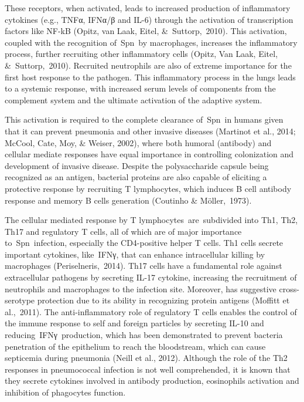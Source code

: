 \documentclass[
]{book}
\begin{document}
These receptors, when activated, leads to increased production of inflammatory cytokines (e.g., TNFα, IFNα/β and IL-6) through the activation of transcription factors like NF-kB (Opitz, van Laak, Eitel, \&~Suttorp,~2010)⁠⁠. This activation, coupled with the recognition of~Spn~by macrophages, increases the inflammatory process, further recruiting other inflammatory cells (Opitz, Van Laak, Eitel, \&~Suttorp,~2010)⁠. Recruited neutrophils are also of extreme importance for the first host response to the pathogen. This inflammatory process in the lungs leads to a systemic response, with increased serum levels of components from the complement system and the ultimate activation of the adaptive system.

This activation is required to the complete clearance of~Spn~in humans given that it can prevent pneumonia and other invasive diseases (Martinot et al., 2014; McCool, Cate, Moy, \& Weiser, 2002)⁠, where both humoral (antibody) and cellular mediate responses have equal importance in controlling colonization and development of invasive disease. Despite the polysaccharide capsule being recognized as an antigen, bacterial proteins are also capable of eliciting a protective response by recruiting T lymphocytes, which induces B cell antibody response and memory B cells generation (Coutinho \& Möller,~1973)⁠.

The cellular mediated response by T lymphocytes~are~subdivided into Th1, Th2, Th17 and regulatory T cells, all of which are of major importance to~Spn~infection, especially the CD4-positive helper T cells. Th1 cells secrete important cytokines, like~IFNγ, that can enhance intracellular killing by macrophages (Periselneris,~2014)⁠. Th17 cells have a fundamental role against extracellular pathogens by secreting IL-17 cytokine, increasing the recruitment of neutrophils and macrophages to the infection site. Moreover, has suggestive cross-serotype protection due to its ability in recognizing protein antigens (Moffitt et al.,~2011)⁠. The anti-inflammatory role of regulatory T cells enables the control of the immune response to self and foreign particles by secreting IL-10 and reducing~IFNγ~production, which has been demonstrated to prevent bacteria penetration of the epithelium to reach the bloodstream, which can cause septicemia during pneumonia (Neill et al., 2012)⁠. Although the role of the Th2 responses in pneumococcal infection is not well comprehended, it is known that they secrete cytokines involved in antibody production, eosinophils activation and inhibition of phagocytes function.
\end{document}
